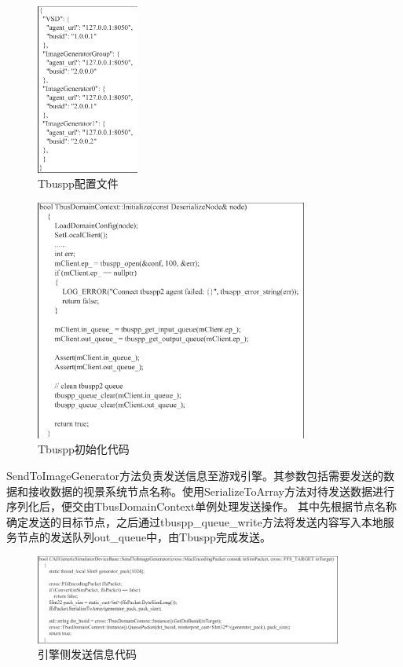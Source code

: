 \begin{figure}[h!]
    \begin{center}
        \includegraphics[width=0.3\textwidth]{pictures/code18.pdf}
        \caption{Tbuspp配置文件}
        \label{tbusconfi}
    \end{center}
\end{figure}
\begin{figure}[h!]
    \begin{center}
        \includegraphics[width=0.8\textwidth]{pictures/code19.pdf}
        \caption{Tbuspp初始化代码}
    \end{center}
\end{figure}
\par
SendToImageGenerator方法负责发送信息至游戏引擎。其参数包括需要发送的数据和接收数据的视景系统节点名称。使用SerializeToArray方法对待发送数据进行序列化后，便交由TbusDomainContext单例处理发送操作。
其中先根据节点名称确定发送的目标节点，之后通过tbuspp\_queue\_write方法将发送内容写入本地服务节点的发送队列out\_queue中，由Tbuspp完成发送。
\begin{figure}[h!]
    \begin{center}
        \includegraphics[width=0.9\textwidth]{pictures/code20.pdf}
        \caption{引擎侧发送信息代码}
    \end{center}
\end{figure}
